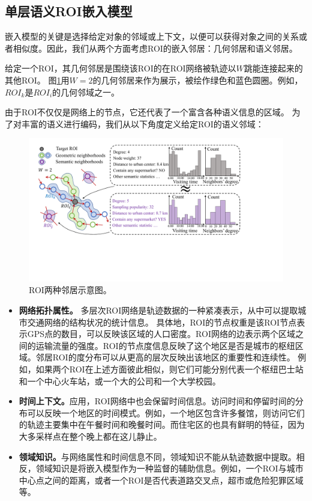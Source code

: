 \subsection{单层语义ROI嵌入模型}
嵌入模型的关键是选择给定对象的邻域或上下文，以便可以获得对象之间的关系或者相似度。因此，我们从两个方面考虑ROI的嵌入邻居：几何邻居和语义邻居。

给定一个ROI，其几何邻居是围绕该ROI的在ROI网络被轨迹以$W$跳能连接起来的其他ROI。 图\ref{fig:context}用$W =2$的几何邻居来作为展示，被绘作绿色和蓝色圆圈。例如，${ROI}_k $是$ {ROI} _i $的几何邻域之一。

由于ROI不仅仅是网络上的节点，它还代表了一个富含各种语义信息的区域。 为了对丰富的语义进行编码，我们从以下角度定义给定ROI的语义邻域：

\tabcolsep=1pt
\begin{figure}[!t]
\centering
\includegraphics[width=130mm]{pics/embedding.pdf}
\caption {ROI两种邻居示意图。}
\label{fig:context}
\end{figure}

\begin{itemize}
\item \textbf{网络拓扑属性。} 多层次ROI网络是轨迹数据的一种紧凑表示，从中可以提取城市交通网络的结构状况的统计信息。 具体地，ROI的节点权重是该ROI节点表示GPS点的数目，可以反映该区域的人口密度。ROI网络的边表示两个区域之间的运输流量的强度。ROI的节点度信息反映了这个地区是否是城市的枢纽区域。邻居ROI的度分布可以从更高的层次反映出该地区的重要性和连续性。 例如，如果两个ROI在上述方面彼此相似，则它们可能分别代表一个枢纽巴士站和一个中心火车站，或一个大的公司和一个大学校园。

\item \textbf{时间上下文。}应用，ROI网络中也会保留时间信息。访问时间和停留时间的分布可以反映一个地区的时间模式。例如，一个地区包含许多餐馆，则访问它们的轨迹主要集中在午餐时间和晚餐时间。而住宅区的也具有鲜明的特征，因为大多采样点在整个晚上都在这儿静止。

\item \textbf{领域知识。}与网络属性和时间信息不同，领域知识不能从轨迹数据中提取。相反，领域知识是将嵌入模型作为一种监督的辅助信息。例如，一个ROI与城市中心点之间的距离，或者一个ROI是否代表道路交叉点，超市或危险犯罪区域等。
\end{itemize}




